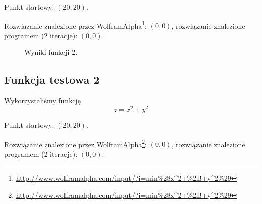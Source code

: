 \documentclass{classrep}
\begin{document}
Punkt startowy: $(20, 20)$.

Rozwiązanie znalezione przez WolframAlpha\footnote{\url{http://www.wolframalpha.com/input/?i=min\%28x^2+\%2B+y^2\%29}}: $(0, 0)$, rozwiązanie znalezione programem (2 iteracje): $(0, 0)$.

\begin{figure}
\noindent{}
\caption{Wyniki funkcji 2.}
\end{figure}

\subsection{Funkcja testowa 2}
Wykorzystaliśmy funkcję
\begin{equation}
  z = x^2 + y^2
\end{equation}

Punkt startowy: $(20, 20)$.

Rozwiązanie znalezione przez WolframAlpha\footnote{\url{http://www.wolframalpha.com/input/?i=min\%28x^2+\%2B+y^2\%29}}: $(0, 0)$, rozwiązanie znalezione programem (2 iteracje): $(0, 0)$.
\end{document}
